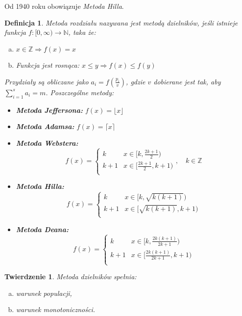 \documentclass[12pt,a4paper]{article}
\theoremstyle{break}
\newtheorem{definition}{Definicja}[section]
\newtheorem{theorem}{Twierdzenie}[section]
\begin{document}
	Od 1940 roku obowiązuje \textit{Metoda Hilla}.
	
	\begin{definition}
		Metoda rozdziału nazywana jest metodą dzielników, jeśli istnieje funkcja 
		$f: [0, \infty) \to \mathbb{N}$, taka że:
		\begin{enumerate}[a)]
			\item $x \in \mathbb{Z} \Rightarrow f(x) = x$
			\item Funkcja jest rosnąca: $x \leq y \Rightarrow f(x) \leq f(y)$
		\end{enumerate}
		
		\noindent Przydziały są obliczane jako $a_i = f\left(\frac{p_i}{v}\right)$, gdzie $v$ dobierane jest tak, aby $\sum_{i=1}^s a_i = m$. Poszczególne metody:
		\begin{itemize}
			\item \textbf{Metoda Jeffersona:} $f(x) = \lfloor x \rfloor$
			\item \textbf{Metoda Adamsa:} $f(x) = \lceil x \rceil$
			\item \textbf{Metoda Webstera:}
			\[
			f(x) =
			\begin{cases} 
				k & x \in [k, \frac{2k+1}{2}) \\
				k+1 & x \in [\frac{2k+1}{2}, k+1) \\
			\end{cases}, \quad k \in \mathbb{Z}
			\]
			\item \textbf{Metoda Hilla:}
			\[
			f(x) =
			\begin{cases} 
				k & x \in [k, \sqrt{k(k+1)}) \\
				k+1 & x \in [\sqrt{k(k+1)}, k+1) \\
			\end{cases}
			\]
			\item \textbf{Metoda Deana:}
			\[
			f(x) =
			\begin{cases} 
				k & x \in [k, \frac{2k(k+1)}{2k+1}) \\
				k+1 & x \in [\frac{2k(k+1)}{2k+1}, k+1) \\
			\end{cases}
			\]
		\end{itemize}
	\end{definition}
	
	\begin{theorem}
		Metoda dzielników spełnia:
		\begin{enumerate}[a)]
			\item warunek populacji,
			\item warunek monotoniczności.
		\end{enumerate}
	\end{theorem}
	
\end{document}
